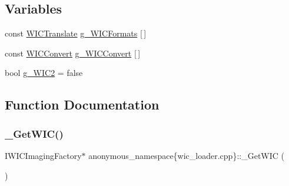 \subsection*{Variables}
\begin{DoxyCompactItemize}
\item 
const \mbox{\hyperlink{structanonymous__namespace_02wic__loader_8cpp_03_1_1_w_i_c_translate}{W\+I\+C\+Translate}} \mbox{\hyperlink{namespaceanonymous__namespace_02wic__loader_8cpp_03_a210d4a316213824222074b4197e2f55e}{g\+\_\+\+W\+I\+C\+Formats}} \mbox{[}$\,$\mbox{]}
\item 
const \mbox{\hyperlink{structanonymous__namespace_02wic__loader_8cpp_03_1_1_w_i_c_convert}{W\+I\+C\+Convert}} \mbox{\hyperlink{namespaceanonymous__namespace_02wic__loader_8cpp_03_a6e53441f5d0f2f1f21fae81be222f5ff}{g\+\_\+\+W\+I\+C\+Convert}} \mbox{[}$\,$\mbox{]}
\item 
bool \mbox{\hyperlink{namespaceanonymous__namespace_02wic__loader_8cpp_03_a1603c49049d1efc34b6586b803e9549c}{g\+\_\+\+W\+I\+C2}} = false
\end{DoxyCompactItemize}


\subsection{Function Documentation}
\mbox{\label{namespaceanonymous__namespace_02wic__loader_8cpp_03_a823769822c5351da1d61aad70cd3d4b3}} 
\subsubsection{\texorpdfstring{\+\_\+\+Get\+W\+I\+C()}{\_GetWIC()}}
{\footnotesize\ttfamily I\+W\+I\+C\+Imaging\+Factory$\ast$ anonymous\+\_\+namespace\{wic\+\_\+loader.\+cpp\}\+::\+\_\+\+Get\+W\+IC (\begin{DoxyParamCaption}{ }\end{DoxyParamCaption})}

\mbox{\label{namespaceanonymous__namespace_02wic__loader_8cpp_03_a567b0e96d3bcaf49f962aeebaaf6ea3a}} 
